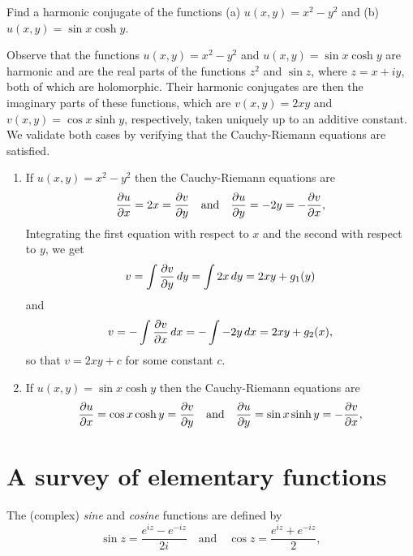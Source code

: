 \begin{example}
    Find a harmonic conjugate of the functions (a) \(u(x, y) = x^2 - y^2\) and (b) \(u(x, y) = \sin x \cosh y\).

    \begin{solution}
        Observe that the functions \(u(x, y) = x^2 - y^2\) and \(u(x, y) = \sin x \cosh y\) are harmonic and are
        the real parts of the functions \(z^2\) and \(\sin z\), where \(z = x + iy\), both of which are holomorphic. Their harmonic conjugates are then the imaginary parts of these functions, which are \(v(x, y) = 2xy\) and \(v(x, y) = \cos x \sinh y\), respectively, taken uniquely up to an additive constant. We validate both cases by verifying that the Cauchy-Riemann equations are satisfied.

        \begin{enumerate}[label=(\alph*), wide]
            \item If \(u(x, y) = x^2 - y^2\) then the Cauchy-Riemann equations are
            \[
                \frac{\partial u}{\partial x} = 2x = \frac{\partial v}{\partial y} \quad \text{and} \quad \frac{\partial u}{\partial y} = -2y = -\frac{\partial v}{\partial x},
            \]
            Integrating the first equation with respect to \(x\) and the second with respect to \(y\), we get
            \[
                v = \int \frac{\partial v}{\partial y}\, dy = \int 2x\, dy = 2xy + g_1(y)
            \]
            and
            \[
                v = -\int \frac{\partial v}{\partial x}\, dx = -\int -2y\, dx = 2xy + g_2(x),
            \]
            so that \(v = 2xy + c\) for some constant \(c\).
            \item If \(u(x, y) = \sin x \cosh y\) then the Cauchy-Riemann equations are
            \[
                \frac{\partial u}{\partial x} = \cos x \cosh y = \frac{\partial v}{\partial y} \quad \text{and} \quad \frac{\partial u}{\partial y} = \sin x \sinh y = -\frac{\partial v}{\partial x},
            \]
        \end{enumerate}
    \end{solution}
\end{example}

\section{A survey of elementary functions}

\begin{definition}
    The (complex) \emph{sine} and \emph{cosine} functions are defined by
    \[
        \sin z = \frac{e^{iz} - e^{-iz}}{2i} \quad \text{and} \quad \cos z = \frac{e^{iz} + e^{-iz}}{2},
    \]
\end{definition}

